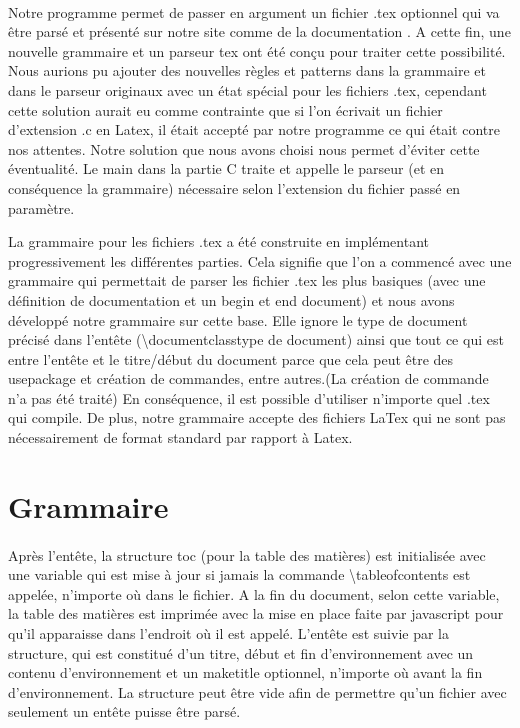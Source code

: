 \documentclass{report}
\begin{document}
{\paragraph{}{Notre programme permet de passer en argument un fichier .tex optionnel qui va être parsé et présenté sur notre site comme de la documentation .
A cette fin, une nouvelle grammaire et un parseur tex ont été conçu pour traiter cette possibilité. Nous aurions pu ajouter des nouvelles règles et patterns dans la grammaire et dans le parseur originaux avec un état spécial pour les fichiers .tex, cependant cette solution aurait eu comme contrainte que si l'on écrivait un fichier d'extension .c en  Latex, il était accepté par notre programme ce qui était contre nos attentes. Notre solution que nous avons choisi nous permet d'éviter cette éventualité. Le main dans la partie C traite et appelle le parseur (et en conséquence la grammaire) nécessaire selon l'extension du fichier passé en paramètre.

La grammaire pour les fichiers .tex a été construite en implémentant progressivement les différentes parties.
Cela signifie que l'on a commencé avec une grammaire qui permettait de parser les fichier .tex les plus basiques (avec une définition de documentation et un begin et end document) et nous avons développé notre grammaire sur cette base. Elle ignore le type de document précisé dans l'entête (\textbackslash documentclass{type de document}) ainsi que tout ce qui est entre l'entête et le titre/début du document parce que cela peut être des usepackage et création de commandes, entre autres.(La création de commande n'a pas été traité)
En conséquence, il est possible d'utiliser n'importe quel .tex qui compile. De plus, notre grammaire accepte des fichiers LaTex qui ne sont pas nécessairement de format standard par rapport à Latex.
}

\section{Grammaire}{
\paragraph{}{
Après l'entête, la structure toc (pour la table des matières) est initialisée avec une variable qui est mise à jour si jamais la commande \textbackslash tableofcontents est appelée, n'importe où dans le fichier. A la fin du document, selon cette variable, la table des matières est imprimée avec la mise en place faite par javascript pour qu'il apparaisse dans l'endroit où il est appelé. L'entête est suivie par la structure, qui est constitué d'un titre, début et fin d'environnement avec un contenu d'environnement et un maketitle optionnel, n'importe où avant la fin d'environnement. La structure peut être vide afin de permettre  qu'un fichier avec seulement un entête puisse être parsé. 

}}}
\end{document}
